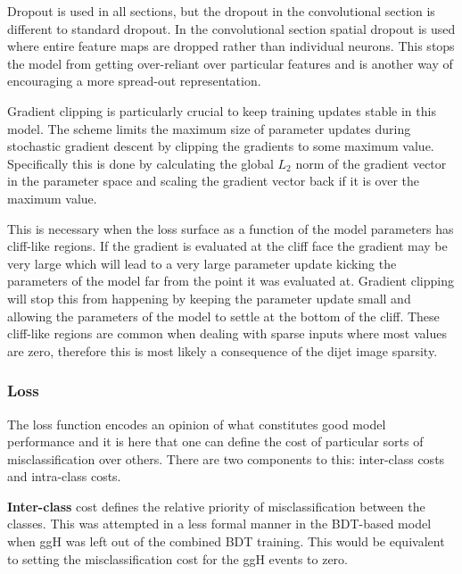 Dropout is used in all sections, but the dropout in the convolutional section is different to standard dropout. 
In the convolutional section spatial dropout is used where entire feature maps are dropped rather than individual neurons. 
This stops the model from getting over-reliant over particular features and is another way of encouraging a more spread-out representation. 


Gradient clipping is particularly crucial to keep training updates stable in this model. 
The scheme limits the maximum size of parameter updates during stochastic gradient descent by clipping the gradients to some maximum value. 
Specifically this is done by calculating the global $L_2$ norm of the gradient vector in the parameter space and scaling the gradient vector back if it is over the maximum value.  

This is necessary when the loss surface as a function of the model parameters has cliff-like regions. If the gradient is evaluated at the cliff face the gradient may be very large which will lead to a very large parameter update kicking the parameters of the model far from the point it was evaluated at. Gradient clipping will stop this from happening by keeping the parameter update small and allowing the parameters of the model to settle at the bottom of the cliff. These cliff-like regions are common when dealing with sparse inputs where most values are zero, therefore this is most likely a consequence of the dijet image sparsity. 



\subsubsection{Loss}
The loss function encodes an opinion of what constitutes good model performance and it is here that one can define the cost of particular sorts of misclassification over others. 
There are two components to this: inter-class costs and intra-class costs. 

\textbf{Inter-class} cost defines the relative priority of misclassification between the classes. 
This was attempted in a less formal manner in the BDT-based model when ggH was left out of the combined BDT training. 
This would be equivalent to setting the misclassification cost for the ggH events to zero. 

